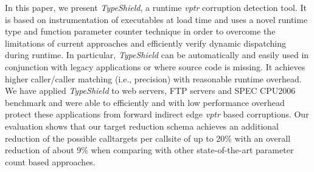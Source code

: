 
In this paper, we present \textit{TypeShield}, a runtime \textit{vptr} corruption
detection tool. It is based on instrumentation of executables at load time
and uses a novel runtime type and function parameter counter technique
in order to overcome the limitations of current approaches and efficiently
verify dynamic dispatching during runtime.
In particular, \textit{TypeShield} can be automatically and easily used
in conjunction with legacy applications or where source code is missing.
It achieves higher caller/caller matching (i.e., precision) with reasonable runtime overhead.
We have applied \textit{TypeShield} to
web servers, FTP servers and SPEC CPU2006 benchmark and were able to efficiently
and with low performance overhead protect these applications from forward indirect edge
\textit{vptr} based corruptions.
Our evaluation shows that our target reduction schema achieves an additional
reduction of the possible calltargets per callsite of up to 
20\% with an overall reduction of about 9\% when comparing with other state-of-the-art
parameter count based approaches.
